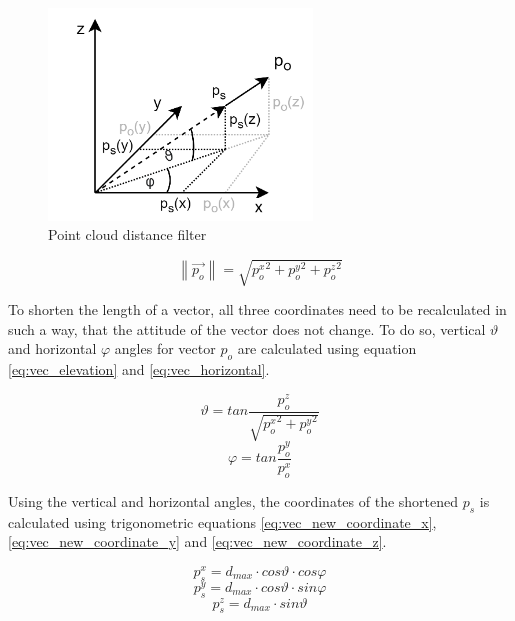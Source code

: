 \begin{figure}[!ht]
    \centering
    \includegraphics[width=70mm, keepaspectratio]{figures/data_distance_filter.png}
    \caption{Point cloud distance filter}
    \label{fig:data_distance_filter}
\end{figure}

\begin{equation} \label{eq:point_length}
    \left\|\vec{p_{o}}\right\| = \sqrt{{p_{o}^{x}}^{2}+{p_{o}^{y}}^{2}+{p_{o}^{z}}^{2}}
\end{equation}

To shorten the length of a vector, all three coordinates need to be recalculated in such a way, that the attitude of
the vector does not change. To do so, vertical $\vartheta$ and horizontal $\varphi$ angles for vector $p_{o}$
are calculated using equation \ref{eq:vec_elevation} and \ref{eq:vec_horizontal}.

\begin{equation} \label{eq:vec_elevation}
    \vartheta=tan\frac{p_{o}^{z}}{\sqrt{{p_{o}^{x}}^{2} + {p_{o}^{y}}^{2}}}
\end{equation}
\begin{equation} \label{eq:vec_horizontal}
    \varphi=tan\frac{p_{o}^{y}}{p_{o}^{x}}
\end{equation}

Using the vertical and horizontal angles, the coordinates of the shortened $p_{s}$ is calculated using
trigonometric equations \ref{eq:vec_new_coordinate_x}, \ref{eq:vec_new_coordinate_y}
and \ref{eq:vec_new_coordinate_z}.

\begin{equation} \label{eq:vec_new_coordinate_x}
    p_{s}^{x} = d_{max} \cdot cos\vartheta \cdot cos\varphi
\end{equation}
\begin{equation} \label{eq:vec_new_coordinate_y}
    p_{s}^{y} = d_{max} \cdot cos\vartheta \cdot sin\varphi
\end{equation}
\begin{equation} \label{eq:vec_new_coordinate_z}
    p_{s}^{z} = d_{max} \cdot  sin\vartheta
\end{equation}



